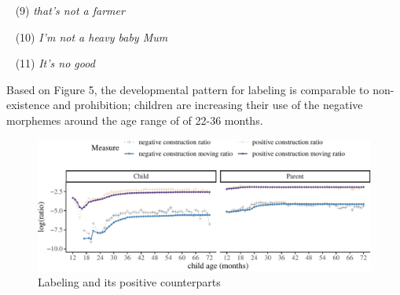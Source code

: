 \documentclass[
  english,
  man,floatsintext]{apa6}
\begin{document}
~
(9) \emph{that's not a farmer}

~
(10) \emph{I'm not a heavy baby Mum}

~
(11) \emph{It's no good}

Based on Figure 5, the developmental pattern for labeling is comparable to non-existence and prohibition; children are increasing their use of the negative morphemes around the age range of of 22-36 months.

\begin{figure}[H]

{\centering \includegraphics{neg_construction_article_files/figure-latex/learning-1} 

}

\caption{Labeling and its positive counterparts}\label{fig:learning}
\end{figure}
\end{document}
